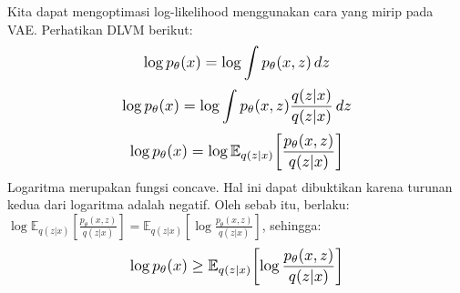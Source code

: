 \documentclass{article}
\newcommand*{\Scale}[2][4]{\scalebox{#1}{\ensuremath{#2}}}
\begin{document}
Kita dapat mengoptimasi log-likelihood menggunakan cara yang mirip pada VAE. Perhatikan DLVM berikut:
\begin{equation}
\Scale[1.2]{ \displaystyle \log p_\theta(x) = \log \int p_\theta(x,z) \,dz }
\end{equation}
\begin{equation}
\Scale[1.2]{ \displaystyle \log p_\theta(x) = \log \int p_\theta(x,z) \frac{q(z|x)}{q(z|x)} \,dz }
\end{equation}
\begin{equation}
\Scale[1.2]{ \displaystyle \log p_\theta(x) = \log \mathbb{E}_{q(z|x)} \left[ \frac{p_\theta(x,z)}{q(z|x)} \right] }
\end{equation}
Logaritma merupakan fungsi concave. Hal ini dapat dibuktikan karena turunan kedua dari logaritma adalah negatif. Oleh sebab itu, berlaku: $ \log \mathbb{E}_{q(z|x)} \left[ \frac{p_\theta(x,z)}{q(z|x)} \right] = \mathbb{E}_{q(z|x)} \left[ \log \frac{p_\theta(x,z)}{q(z|x)} \right] $, sehingga:
\begin{equation}
\Scale[1.2]{ \displaystyle \log p_\theta(x) \geq \mathbb{E}_{q(z|x)} \left[\log \frac{p_\theta(x,z)}{q(z|x)} \right] }
\end{equation}
\end{document}
